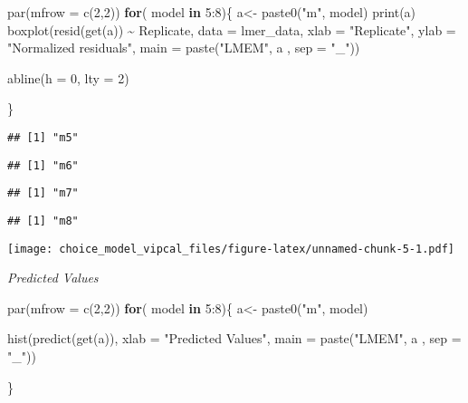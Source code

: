\documentclass[
]{article}
\newenvironment{Shaded}{\begin{snugshade}}{\end{snugshade}}
\newcommand{\AttributeTok}[1]{\textcolor[rgb]{0.77,0.63,0.00}{#1}}
\newcommand{\ControlFlowTok}[1]{\textcolor[rgb]{0.13,0.29,0.53}{\textbf{#1}}}
\newcommand{\DecValTok}[1]{\textcolor[rgb]{0.00,0.00,0.81}{#1}}
\newcommand{\FunctionTok}[1]{\textcolor[rgb]{0.00,0.00,0.00}{#1}}
\newcommand{\NormalTok}[1]{#1}
\newcommand{\OtherTok}[1]{\textcolor[rgb]{0.56,0.35,0.01}{#1}}
\newcommand{\SpecialCharTok}[1]{\textcolor[rgb]{0.00,0.00,0.00}{#1}}
\newcommand{\StringTok}[1]{\textcolor[rgb]{0.31,0.60,0.02}{#1}}
\begin{document}
\begin{Shaded}
\begin{Highlighting}[]
\FunctionTok{par}\NormalTok{(}\AttributeTok{mfrow =} \FunctionTok{c}\NormalTok{(}\DecValTok{2}\NormalTok{,}\DecValTok{2}\NormalTok{))}
\ControlFlowTok{for}\NormalTok{( model }\ControlFlowTok{in} \DecValTok{5}\SpecialCharTok{:}\DecValTok{8}\NormalTok{)\{}
\NormalTok{  a}\OtherTok{\textless{}{-}} \FunctionTok{paste0}\NormalTok{(}\StringTok{"m"}\NormalTok{, model)}
  \FunctionTok{print}\NormalTok{(a)}
  \FunctionTok{boxplot}\NormalTok{(}\FunctionTok{resid}\NormalTok{(}\FunctionTok{get}\NormalTok{(a)) }\SpecialCharTok{\textasciitilde{}}\NormalTok{ Replicate, }
          \AttributeTok{data =}\NormalTok{ lmer\_data, }
          \AttributeTok{xlab =} \StringTok{"Replicate"}\NormalTok{,}
          \AttributeTok{ylab =} \StringTok{"Normalized residuals"}\NormalTok{,}
          \AttributeTok{main =} \FunctionTok{paste}\NormalTok{(}\StringTok{"LMEM"}\NormalTok{, a , }\AttributeTok{sep =} \StringTok{"\_"}\NormalTok{))}
 
  \FunctionTok{abline}\NormalTok{(}\AttributeTok{h =} \DecValTok{0}\NormalTok{, }\AttributeTok{lty =} \DecValTok{2}\NormalTok{)}
  
\NormalTok{\}}
\end{Highlighting}
\end{Shaded}

\begin{verbatim}
## [1] "m5"
\end{verbatim}

\begin{verbatim}
## [1] "m6"
\end{verbatim}

\begin{verbatim}
## [1] "m7"
\end{verbatim}

\begin{verbatim}
## [1] "m8"
\end{verbatim}

\texttt{[image: choice\_model\_vipcal\_files/figure-latex/unnamed-chunk-5-1.pdf]}

\emph{Predicted Values }

\begin{Shaded}
\begin{Highlighting}[]
\FunctionTok{par}\NormalTok{(}\AttributeTok{mfrow =} \FunctionTok{c}\NormalTok{(}\DecValTok{2}\NormalTok{,}\DecValTok{2}\NormalTok{))}
\ControlFlowTok{for}\NormalTok{( model }\ControlFlowTok{in} \DecValTok{5}\SpecialCharTok{:}\DecValTok{8}\NormalTok{)\{}
\NormalTok{ a}\OtherTok{\textless{}{-}} \FunctionTok{paste0}\NormalTok{(}\StringTok{"m"}\NormalTok{, model)}
 
\FunctionTok{hist}\NormalTok{(}\FunctionTok{predict}\NormalTok{(}\FunctionTok{get}\NormalTok{(a)),}
      \AttributeTok{xlab =} \StringTok{"Predicted Values"}\NormalTok{,}
     \AttributeTok{main =} \FunctionTok{paste}\NormalTok{(}\StringTok{"LMEM"}\NormalTok{, a , }\AttributeTok{sep =} \StringTok{"\_"}\NormalTok{)) }
  
\NormalTok{\}}
\end{Highlighting}
\end{Shaded}
\end{document}

